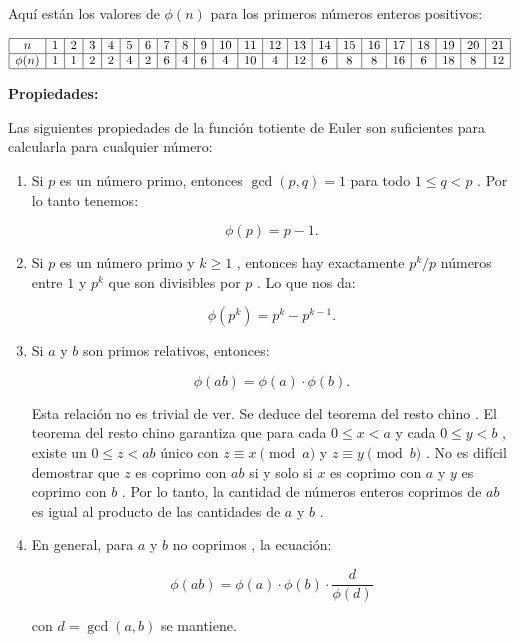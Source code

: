 Aquí están los valores de $\phi(n)$ para los primeros números enteros positivos:

$$
\begin{array}{|c|c|c|c|c|c|c|c|c|c|c|c|c|c|c|c|c|c|c|c|c|c|}
	\hline
	n & 1 & 2 & 3 & 4 & 5 & 6 & 7 & 8 & 9 & 10 & 11 & 12 & 13 & 14 & 15 & 16 & 17 & 18 & 19 & 20 & 21 \\ \hline
	\phi(n) & 1 & 1 & 2 & 2 & 4 & 2 & 6 & 4 & 6 & 4 & 10 & 4 & 12 & 6 & 8 & 8 & 16 & 6 & 18 & 8 & 12 \\ \hline
\end{array}
$$

\textbf{Propiedades:}

Las siguientes propiedades de la función totiente de Euler son suficientes para calcularla para cualquier número:

\begin{enumerate}
	\item 
	Si $p$ es un número primo, entonces $\gcd(p, q) = 1$ para todo $1 \le q < p$ . Por lo tanto tenemos:
	
	$$\phi (p) = p - 1.$$ 
	
	\item Si $p$ es un número primo y $k \ge 1$ , entonces hay exactamente $p^k / p$ números entre $1$ y $p^k$ que son divisibles por $p$ . Lo que nos da:
	
	$$\phi(p^k) = p^k - p^{k-1}.$$ 
	
	\item Si $a$ y $b$ son primos relativos, entonces:
	
	$$\phi(ab) = \phi(a) \cdot \phi(b).$$ 
	
	Esta relación no es trivial de ver. Se deduce del teorema del resto chino . El teorema del resto chino garantiza que para cada $0 \le x < a$ y cada $0 \le y < b$ , existe un $0 \le z < ab$ único con $z \equiv x \pmod{a}$ y $z \equiv y \pmod{b}$ . No es difícil demostrar que $z$ es coprimo con $ab$ si y solo si $x$ es coprimo con $a$ y $y$ es coprimo con $b$ . Por lo tanto, la cantidad de números enteros coprimos de $ab$ es igual al producto de las cantidades de $a$ y $b$ .
	
	\item En general, para $a$ y $b$ no coprimos , la ecuación:
	
	$$\phi(ab) = \phi(a) \cdot \phi(b) \cdot \dfrac{d}{\phi(d)}$$ 
	
	con $d = \gcd(a, b)$ se mantiene.
	
\end{enumerate}

